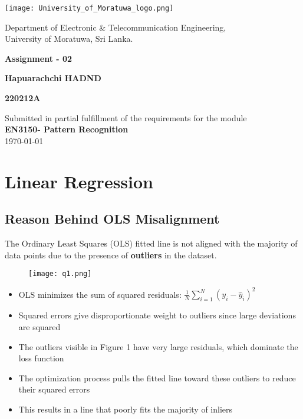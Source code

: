 \documentclass[12pt]{article}
\begin{document}
\begin{titlepage}
	\centering
	\vspace*{0.5cm}
	\texttt{[image: University\_of\_Moratuwa\_logo.png]} %
	\par\vspace{0.5cm}
	\Large
	Department of Electronic \& Telecommunication Engineering,\\
	University of Moratuwa, Sri Lanka.
	\vspace{1cm}\\
	{\LARGE\bfseries Assignment - 02\par}
        \vspace{2cm}
	{\LARGE\bfseries Hapuarachchi HADND\par}
        {\LARGE\bfseries 220212A\par}
	\vspace{2cm}
	Submitted in partial fulfillment of the requirements for the module \\
	\textbf{ EN3150- Pattern Recognition}\\
	\vspace{1cm}
	{\large \today}
	\vfill
\date{}
\end{titlepage}

\newpage
\tableofcontents
\newpage

\section{Linear Regression}

\subsection{Reason Behind OLS Misalignment}

The Ordinary Least Squares (OLS) fitted line is not aligned with the majority of data points due to the presence of \textbf{outliers} in the dataset. 
\begin{figure}[h]
    \centering
    \texttt{[image: q1.png]}
\end{figure}
\begin{itemize}
    \item OLS minimizes the sum of squared residuals: $\frac{1}{N}\sum_{i=1}^{N}(y_i - \hat{y}_i)^2$
    \item Squared errors give disproportionate weight to outliers since large deviations are squared
    \item The outliers visible in Figure 1 have very large residuals, which dominate the loss function
    \item The optimization process pulls the fitted line toward these outliers to reduce their squared errors
    \item This results in a line that poorly fits the majority of inliers
\end{itemize}
\end{document}

